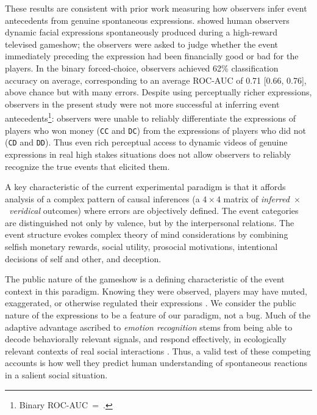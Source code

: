 \documentclass[10pt,letterpaper]{article}
\newcommand{\CC}{\texttt{CC}\xspace}
\newcommand{\CD}{\texttt{CD}\xspace}
\newcommand{\DC}{\texttt{DC}\xspace}
\newcommand{\DD}{\texttt{DD}\xspace}
\begin{document}

These results are consistent with prior work measuring how observers infer event antecedents from genuine spontaneous expressions. \citet{albanie2016dealnodeal} showed human observers dynamic facial expressions spontaneously produced during a high-reward televised gameshow; the observers were asked to judge whether the event immediately preceding the expression had been financially good or bad for the players. 
In the binary forced-choice, observers achieved 62\% classification accuracy on average, corresponding to an average ROC-AUC of 0.71 [0.66, 0.76], above chance but with many errors. Despite using perceptually richer expressions, observers in the present study were not more successful at inferring event antecedents\footnote{Binary ROC-AUC~=~.}: observers were unable to reliably differentiate the expressions of players who won money (\CC and \DC) from the expressions of players who did not (\CD and \DD).
Thus even rich perceptual access to dynamic videos of genuine expressions in real high stakes situations does not allow observers to reliably recognize the true events that elicited them.

A key characteristic of the current experimental paradigm is that it affords analysis of a complex pattern of causal inferences (a $4 \times 4$ matrix of {\em inferred}~$\times$~{\em veridical} outcomes) where errors are objectively defined. The event categories are distinguished not only by valence, but by the interpersonal relations.
The event structure evokes complex theory of mind considerations by combining selfish monetary rewards, social utility, prosocial motivations, intentional decisions of self and other, and deception. 




The public nature of the gameshow is a defining characteristic of the event context in this paradigm. 
Knowing they were observed, players may have muted, exaggerated, or otherwise regulated their expressions \citep{ekman1993ap, fridlund1991implicitaudience, williams2021socialexpressions}. 
We consider the public nature of the expressions to be a feature of our paradigm, not a bug. 
Much of the adaptive advantage ascribed to {\em emotion recognition} stems from being able to decode behaviorally relevant signals, and respond effectively, in ecologically relevant contexts of real social interactions \citep{tracy2014emotionreview, shariff2011cdps}. Thus, a valid test of these competing accounts is how well they predict human understanding of spontaneous reactions in a salient social situation.
\end{document}
